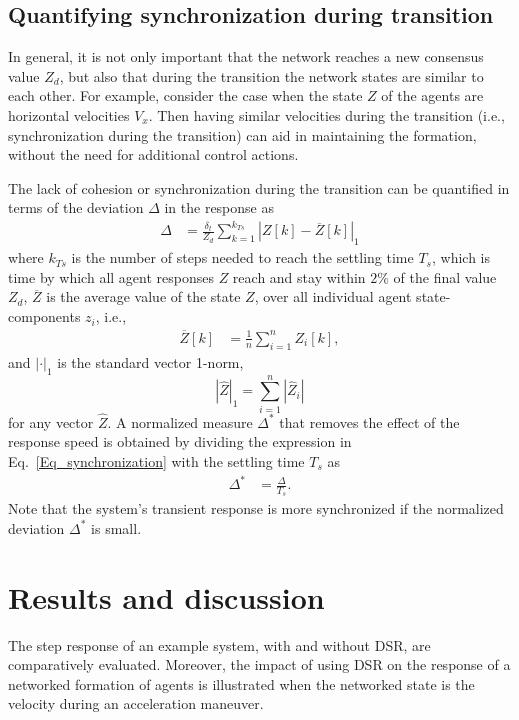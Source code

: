 \documentclass[conference]{IEEEtran}
\begin{document}
\subsection{Quantifying synchronization during transition}
In general, it is not only important that the network reaches  a new consensus value $Z_d$, but also that during the transition 
the network states are similar to each other. 
For example, consider the case when 
the state $Z$ of the agents are horizontal velocities $V_x$. Then having similar velocities 
during the transition (i.e., synchronization during the transition) can aid in maintaining the formation, without the 
need for additional control actions. 

\vspace{0.1in}
The lack of  cohesion or synchronization during the transition can be quantified in terms of the 
deviation $\Delta$  in the response 
as 
\begin{align}
\Delta &  =  \frac{\delta_t}{Z_d} \sum_{k=1}^{k_{Ts} } \left| Z[k] - \overline{Z}[k]  \right|_1
\label{Eq_synchronization}
\end{align}
where $k_{Ts} $ is the number of steps needed to reach the settling time $T_s$, which 
is time by which all agent responses $Z$ reach and stay within $2\%$ of the final value $Z_d$,  
$ \overline{Z}$ is the average value of the state $Z$, over all individual agent state-components $z_i$, i.e., 
\begin{align}
 \overline{Z}[k]  & = \frac{1}{n} \sum_{i=1}^{n} Z_i[k], 
\label{Eq_synchronization_2}
\end{align}
and 
 $|  \cdot |_1  $ is the standard vector 1-norm, 
$$| \hat{Z} |_1  = \sum_{i=1}^{n} | \hat{Z}_i|$$ for any vector $\hat{Z}$. 
A normalized measure ${\Delta}^*$  that removes the effect of the response speed is obtained by 
dividing the expression in Eq.~\eqref{Eq_synchronization} with the settling time $T_s$ as 
\begin{align}
{\Delta}^* &  =   \frac{\Delta}{T_s} .
\label{Eq_norm_synchronization}
\end{align}
Note that the system's transient response is more synchronized if the normalized deviation ${\Delta}^* $ is small.










\section{Results and discussion}
\label{Results_and_Discussion}
\vspace{-0.01in}
The step response of an example system, with and without DSR, are comparatively evaluated. Moreover, the impact of using DSR  on the response of a networked formation of agents is illustrated when the networked state is the velocity during an acceleration maneuver. 
\end{document}
